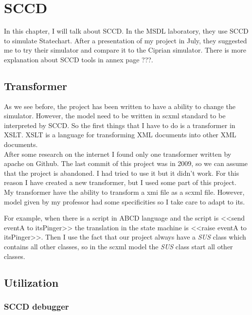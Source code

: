 
\chapter{SCCD}
\label{chap:sccd}

In this chapter, I will talk about SCCD. In the MSDL laboratory, they use SCCD to simulate Statechart. After a presentation of my project in July, they suggested me to try their simulator and compare it to the Ciprian simulator. There is more explanation about SCCD tools in annex page ???.

\section{Transformer}

As we see before, the project has been written to have a ability to change the simulator. However, the model need to be written in scxml standard to be interpreted by SCCD. So the first things that I have to do is a transformer in XSLT. XSLT is a language for transforming XML documents into other XML documents.
~\\

After some research on the internet I found only one transformer written by apache on Github\cite{apache}. The last commit of this project was in 2009, so we can assume that the project is abandoned. I had tried to use it but it didn't work. For this reason I have created a new transformer, but I used some part of this project.
~\\

My transformer have the ability to transform a xmi file as a scxml file. However, model given by my professor had some specificities so I take care to adapt to its.

For example, when there is a script in ABCD language and the script is <<send eventA to itsPinger>> the translation in the state machine is <<raise eventA to itsPinger>>. Then I use the fact that our project always have a \textit{SUS} class which contains all other classes, so in the scxml model the \textit{SUS} class start all other classes.

\section{Utilization}

\subsection{SCCD debugger}

